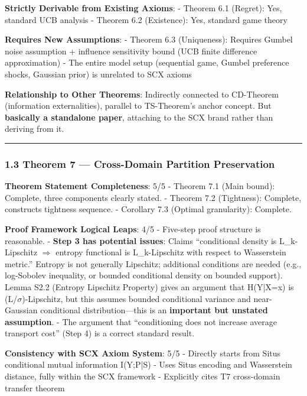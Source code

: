 \documentclass[
  12pt,
]{article}
\begin{document}
\textbf{Strictly Derivable from Existing Axioms}:
- Theorem 6.1 (Regret): Yes, standard UCB analysis
- Theorem 6.2 (Existence): Yes, standard game theory

\textbf{Requires New Assumptions}:
- Theorem 6.3 (Uniqueness): Requires Gumbel noise assumption + influence sensitivity bound (UCB finite difference approximation)
- The entire model setup (sequential game, Gumbel preference shocks, Gaussian prior) is unrelated to SCX axioms

\textbf{Relationship to Other Theorems}: Indirectly connected to CD-Theorem (information externalities), parallel to TS-Theorem's anchor concept. But \textbf{basically a standalone paper}, attaching to the SCX brand rather than deriving from it.

\begin{center}\rule{0.5\linewidth}{0.5pt}\end{center}

\subsubsection{1.3 Theorem 7 --- Cross-Domain Partition Preservation}\label{theorem-7-cross-domain}

\textbf{Theorem Statement Completeness}: 5/5
- Theorem 7.1 (Main bound): Complete, three components clearly stated.
- Theorem 7.2 (Tightness): Complete, constructs tightness sequence.
- Corollary 7.3 (Optimal granularity): Complete.

\textbf{Proof Framework Logical Leaps}: 4/5
- Five-step proof structure is reasonable.
- \textbf{Step 3 has potential issues}: Claims ``conditional density is L\_k-Lipschitz $\Rightarrow$ entropy functional is L\_k-Lipschitz with respect to Wasserstein metric.'' Entropy is not generally Lipschitz; additional conditions are needed (e.g., log-Sobolev inequality, or bounded conditional density on bounded support). Lemma S2.2 (Entropy Lipschitz Property) gives an argument that H(Y|X=x) is (L/$\sigma$)-Lipschitz, but this assumes bounded conditional variance and near-Gaussian conditional distribution---this is an \textbf{important but unstated assumption}.
- The argument that ``conditioning does not increase average transport cost'' (Step 4) is a correct standard result.

\textbf{Consistency with SCX Axiom System}: 5/5
- Directly starts from Situs conditional mutual information I(Y;P|S)
- Uses Situs encoding and Wasserstein distance, fully within the SCX framework
- Explicitly cites T7 cross-domain transfer theorem
\end{document}
